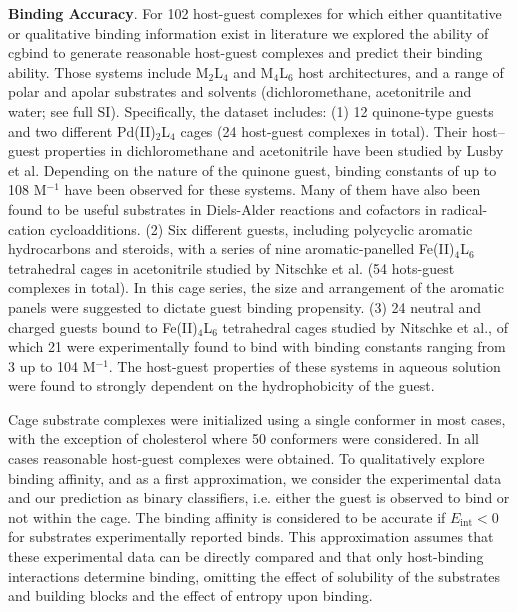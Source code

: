 \documentclass[../../main.tex]{subfiles}
\newcommand{\MLf}{M$_2$L$_4$ }
\newcommand{\MLs}{M$_4$L$_6$ }
\begin{document}
{\bfseries{Binding Accuracy}}. For 102 host-guest complexes for which either quantitative or qualitative binding information exist in literature we explored the ability of cgbind to generate reasonable host-guest complexes and predict their binding ability. Those systems include \MLf and \MLs host architectures, and a range of polar and apolar substrates and solvents (dichloromethane, acetonitrile and water; see full SI). Specifically, the dataset includes: (1) 12 quinone‐type guests and two different Pd(II)$_2$L$_4$ cages (24 host-guest complexes in total). Their host–guest properties in dichloromethane and acetonitrile have been studied by Lusby et al.\cite{August2016} Depending on the nature of the quinone guest, binding constants of up to 108 M${}^{-1}$ have been observed for these systems. Many of them have also been found to be useful substrates in Diels-Alder reactions and cofactors in radical-cation cycloadditions.\cite{MartCentelles2018, Spicer2020} (2)	Six different guests, including polycyclic aromatic hydrocarbons and steroids, with a series of nine aromatic-panelled Fe(II)$_4$L$_6$ tetrahedral cages in acetonitrile studied by Nitschke et al. (54 hots-guest complexes in total).\cite{Ronson2017} In this cage series, the size and arrangement of the aromatic panels were suggested to dictate guest binding propensity. 
(3)	24 neutral and charged guests bound to Fe(II)$_4$L$_6$  tetrahedral cages studied by Nitschke et al.,\cite{Smulders2013} of which 21 were experimentally found to bind with binding constants ranging from 3 up to 104 M$^{-1}$. The host-guest properties of these systems in aqueous solution were found to strongly dependent on the hydrophobicity of the guest.

Cage substrate complexes were initialized using a single conformer in most cases, with the exception of cholesterol where 50 conformers were considered. In all cases reasonable host-guest complexes were obtained. To qualitatively explore binding affinity, and as a first approximation, we consider the experimental data and our prediction as binary classifiers, i.e. either the guest is observed to bind or not within the cage. The binding affinity is considered to be accurate if $E_\text{int} < 0$ for substrates experimentally reported binds. This approximation assumes that these experimental data can be directly compared and that only host-binding interactions determine binding, omitting the effect of solubility of the substrates and building blocks and the effect of entropy upon binding. 
\end{document}
